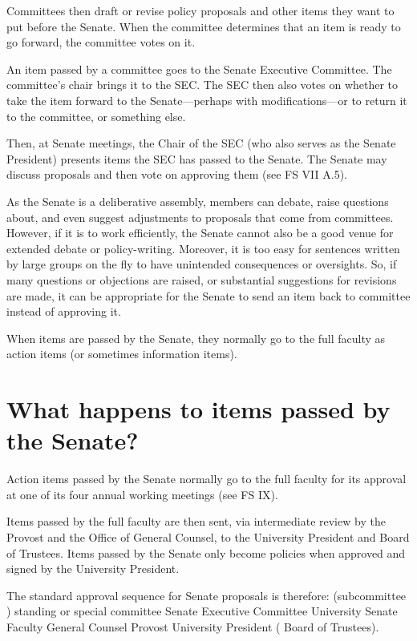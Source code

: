 \documentclass[12pt]{article}
\begin{document}
Committees then draft or revise policy proposals and other items they
want to put before the Senate. When the committee determines that an
item is ready to go forward, the committee votes on it.

An item passed by a committee goes to the Senate Executive Committee.
The committee's chair brings it to the SEC. The SEC then also votes on
whether to take the item forward to the Senate---perhaps with
modifications---or to return it to the committee, or something else.

Then, at Senate meetings, the Chair of the SEC (who also serves as the
Senate President) presents items the SEC has passed to the Senate. The
Senate may discuss proposals and then vote on approving them (see FS VII
A.5).

As the Senate is a deliberative assembly, members can debate, raise
questions about, and even suggest adjustments to proposals that come
from committees. However, if it is to work efficiently, the Senate
cannot also be a good venue for extended debate or policy-writing.
Moreover, it is too easy for sentences written by large groups on the
fly to have unintended consequences or oversights. So, if many questions
or objections are raised, or substantial suggestions for revisions are
made, it can be appropriate for the Senate to send an item back to
committee instead of approving it.

When items are passed by the Senate, they normally go to the full
faculty as action items (or sometimes information items).

\section{What happens to items passed by the
Senate?}\label{what-happens-to-items-passed-by-the-senate}

Action items passed by the Senate normally go to the full faculty for
its approval at one of its four annual working meetings (see FS IX).

Items passed by the full faculty are then sent, via intermediate review
by the Provost and the Office of General Counsel, to the University
President and Board of Trustees. Items passed by the Senate only become
policies when approved and signed by the University President.

The standard approval sequence for Senate proposals is therefore:
(subcommittee \rightarrow{}) standing or special committee
\rightarrow{} Senate Executive Committee \rightarrow{} University Senate
\rightarrow{} Faculty \rightarrow{} General Counsel \rightarrow{}
Provost \rightarrow{} University President ( \rightarrow{} Board of
Trustees).
\end{document}
